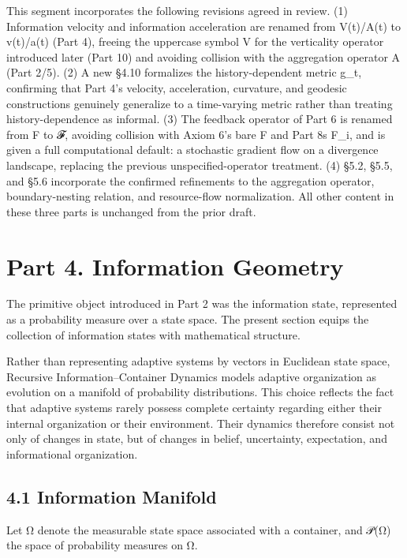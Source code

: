 \documentclass[
]{article}
\begin{document}
This segment incorporates the following revisions agreed in review. (1)
Information velocity and information acceleration are renamed from
V(t)/A(t) to v(t)/a(t) (Part 4), freeing the uppercase symbol V for the
verticality operator introduced later (Part 10) and avoiding collision
with the aggregation operator A (Part 2/5). (2) A new §4.10 formalizes
the history-dependent metric g\_t, confirming that Part 4's velocity,
acceleration, curvature, and geodesic constructions genuinely generalize
to a time-varying metric rather than treating history-dependence as
informal. (3) The feedback operator of Part 6 is renamed from F to 𝓕,
avoiding collision with Axiom 6's bare F and Part 8s F\_i, and is given a
full computational default: a stochastic gradient flow on a divergence
landscape, replacing the previous unspecified-operator treatment. (4)
§5.2, §5.5, and §5.6 incorporate the confirmed refinements to the
aggregation operator, boundary-nesting relation, and resource-flow
normalization. All other content in these three parts is unchanged from
the prior draft.

\hypertarget{part-4.-information-geometry}{%
\section{Part 4. Information
Geometry}\label{part-4.-information-geometry}}

The primitive object introduced in Part 2 was the information state,
represented as a probability measure over a state space. The present
section equips the collection of information states with mathematical
structure.

Rather than representing adaptive systems by vectors in Euclidean state
space, Recursive Information--Container Dynamics models adaptive
organization as evolution on a manifold of probability distributions.
This choice reflects the fact that adaptive systems rarely possess
complete certainty regarding either their internal organization or their
environment. Their dynamics therefore consist not only of changes in
state, but of changes in belief, uncertainty, expectation, and
informational organization.

\hypertarget{information-manifold}{%
\subsection{4.1 Information Manifold}\label{information-manifold}}

Let Ω denote the measurable state space associated with a container, and
𝒫(Ω) the space of probability measures on Ω.
\end{document}
